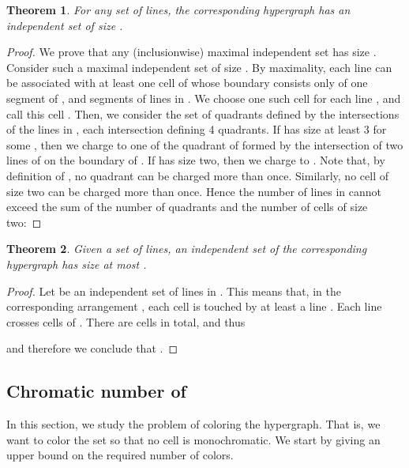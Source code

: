 \documentclass[11pt,a4paper]{article}
\newtheorem{theorem}{Theorem}
\begin{document}
\begin{theorem}\label{th:is}
For any set  of  lines, the corresponding  hypergraph has an independent set of size .
\end{theorem}
\begin{proof}
We prove that any (inclusionwise) maximal independent set has size . Consider such a maximal independent set  of size . 
By maximality, each line  can be associated with at least one cell of  whose boundary consists only of one segment of , and segments of  lines in . We choose one such cell for each line , and call this cell . Then, we consider the set  of quadrants defined by the intersections of the lines in , each intersection defining 4 quadrants. If  has size at least 3 for some , then we charge  to one of the quadrant of  formed by the intersection of two lines of  on the boundary of . If  has size two, then we charge  to . Note that, by definition of , no quadrant can be charged more than once. Similarly, no cell of size two can be charged more than once. Hence the number of lines in  cannot exceed the sum of the number of quadrants and the number of cells of size two:

\end{proof}

\begin{theorem}\label{th:ubis}
Given a set  of  lines, an independent set of the corresponding  hypergraph has size at most .
\end{theorem}
\begin{proof}
Let  be an independent set of lines in . This means that, in the corresponding arrangement , each cell is touched by at least a line . Each line  crosses  cells of . There are  cells in total, and thus




\noindent and therefore we conclude that .
\end{proof}

\subsection{Chromatic number of }
In this section, we study the problem of coloring the  hypergraph. That is, we want to color the set  so that no cell is monochromatic. We start by giving an upper bound on the required number of colors.
\end{document}
